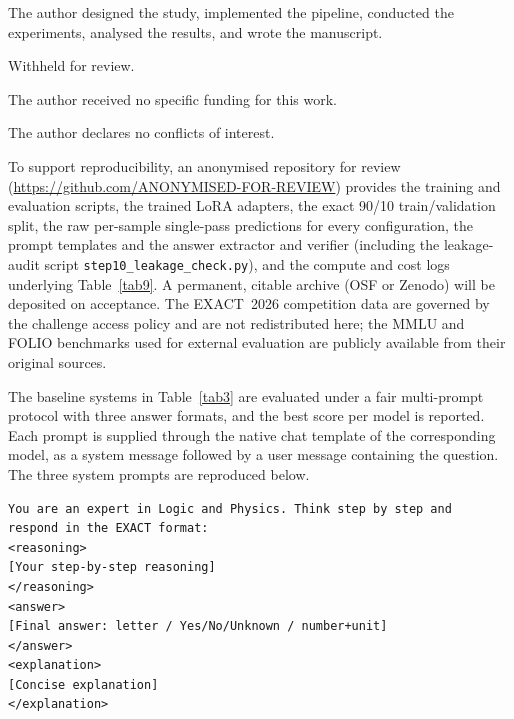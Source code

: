 \documentclass[APA,twocolumn]{USG}
\newcommand{\dataset}{EXACT~2026}
\begin{document}
The author designed the study, implemented the pipeline, conducted the
experiments, analysed the results, and wrote the manuscript.

Withheld for review.

The author received no specific funding for this work.

The author declares no conflicts of interest.

To support reproducibility, an anonymised repository for review
(\url{https://github.com/ANONYMISED-FOR-REVIEW}) provides the training and
evaluation scripts, the trained LoRA adapters, the exact 90/10 train/validation
split, the raw per-sample single-pass predictions for every configuration, the
prompt templates and the answer extractor and verifier (including the
leakage-audit script \texttt{step10\_leakage\_check.py}), and the compute and
cost logs underlying Table~\ref{tab9}. A permanent, citable archive
(OSF or Zenodo) will be deposited on acceptance. The \dataset{} competition data
are governed by the challenge access policy and are not redistributed here; the
MMLU \citep{Hendrycks2021} and FOLIO \citep{Han2022folio} benchmarks used for
external evaluation are publicly available from their original sources.



\appendix
{}

The baseline systems in Table~\ref{tab3} are evaluated under a fair
multi-prompt protocol with three answer formats, and the best score per model is
reported. Each prompt is supplied through the native chat template of the
corresponding model, as a system message followed by a user message containing
the question. The three system prompts are reproduced below.

\begin{lstlisting}[caption={XML prompt.},captionpos=b]
You are an expert in Logic and Physics. Think step by step and
respond in the EXACT format:
<reasoning>
[Your step-by-step reasoning]
</reasoning>
<answer>
[Final answer: letter / Yes/No/Unknown / number+unit]
</answer>
<explanation>
[Concise explanation]
</explanation>
\end{lstlisting}
\end{document}
